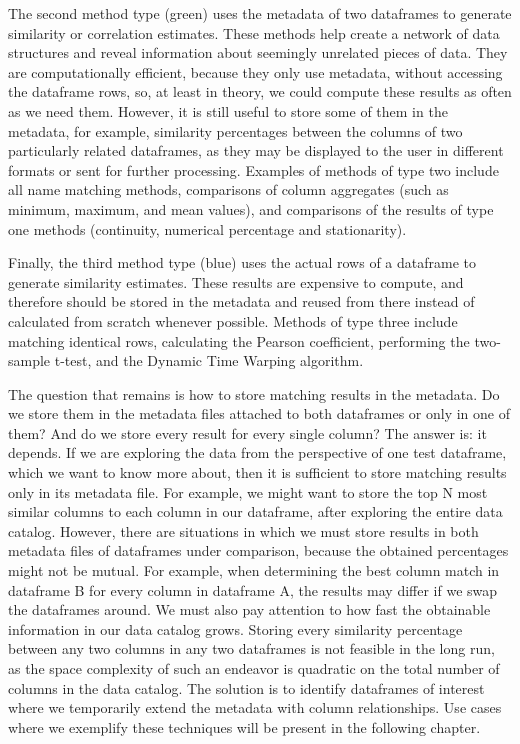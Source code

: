 The second method type (green) uses the metadata of two dataframes to generate similarity or correlation estimates.
These methods help create a network of data structures and reveal information about seemingly unrelated pieces of data.
They are computationally efficient, because they only use metadata, without accessing the dataframe rows, so, at least
in theory, we could compute these results as often as we need them.
However, it is still useful to store some of them in the metadata, for example, similarity percentages between the columns
of two particularly related dataframes, as they may be displayed to the user in different formats or sent for further processing.
Examples of methods of type two include all name matching methods, comparisons of column aggregates (such as minimum, maximum,
and mean values), and comparisons of the results of type one methods (continuity, numerical percentage and stationarity).

Finally, the third method type (blue) uses the actual rows of a dataframe to generate similarity estimates.
These results are expensive to compute, and therefore should be stored in the metadata and reused from there instead of
calculated from scratch whenever possible.
Methods of type three include matching identical rows, calculating the Pearson coefficient, performing the two-sample t-test,
and the Dynamic Time Warping algorithm.

The question that remains is how to store matching results in the metadata.
Do we store them in the metadata files attached to both dataframes or only in one of them?
And do we store every result for every single column?
The answer is: it depends.
If we are exploring the data from the perspective of one test dataframe, which we want to know more about, then it is
sufficient to store matching results only in its metadata file.
For example, we might want to store the top N most similar columns to each column in our dataframe, after exploring the entire
data catalog.
However, there are situations in which we must store results in both metadata files of dataframes under comparison, because
the obtained percentages might not be mutual.
For example, when determining the best column match in dataframe B for every column in dataframe A, the results may differ
if we swap the dataframes around.
We must also pay attention to how fast the obtainable information in our data catalog grows.
Storing every similarity percentage between any two columns in any two dataframes is not feasible in the long run, as the
space complexity of such an endeavor is quadratic on the total number of columns in the data catalog.
The solution is to identify dataframes of interest where we temporarily extend the metadata with column relationships.
Use cases where we exemplify these techniques will be present in the following chapter.

